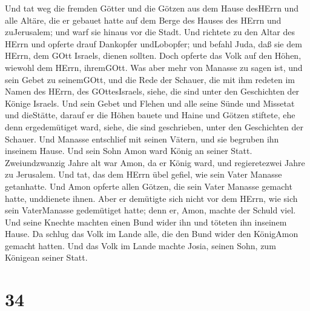 Und tat weg die fremden Götter und die Götzen aus dem Hause desHErrn und
alle Altäre, die er gebauet hatte auf dem Berge des Hauses des HErrn und
zuJerusalem; und warf sie hinaus vor die Stadt.  Und
richtete zu den Altar des HErrn und opferte drauf Dankopfer undLobopfer;
und befahl Juda, daß sie dem HErrn, dem GOtt Israels, dienen sollten.
 Doch opferte das Volk auf den Höhen, wiewohl dem HErrn,
ihremGOtt.  Was aber mehr von Manasse zu sagen ist, und
sein Gebet zu seinemGOtt, und die Rede der Schauer, die mit ihm redeten
im Namen des HErrn, des GOttesIsraels, siehe, die sind unter den
Geschichten der Könige Israels.  Und sein Gebet und Flehen
und alle seine Sünde und Missetat und dieStätte, darauf er die Höhen
bauete und Haine und Götzen stiftete, ehe denn ergedemütiget ward,
siehe, die sind geschrieben, unter den Geschichten der Schauer.
 Und Manasse entschlief mit seinen Vätern, und sie begruben
ihn inseinem Hause. Und sein Sohn Amon ward König an seiner Statt.
 Zweiundzwanzig Jahre alt war Amon, da er König ward, und
regieretezwei Jahre zu Jerusalem.  Und tat, das dem HErrn
übel gefiel, wie sein Vater Manasse getanhatte. Und Amon opferte allen
Götzen, die sein Vater Manasse gemacht hatte, unddienete ihnen.
 Aber er demütigte sich nicht vor dem HErrn, wie sich sein
VaterManasse gedemütiget hatte; denn er, Amon, machte der Schuld viel.
 Und seine Knechte machten einen Bund wider ihn und töteten
ihn inseinem Hause.  Da schlug das Volk im Lande alle, die
den Bund wider den KönigAmon gemacht hatten. Und das Volk im Lande
machte Josia, seinen Sohn, zum Königean seiner Statt.

\hypertarget{section-33}{%
\section{34}\label{section-33}}

